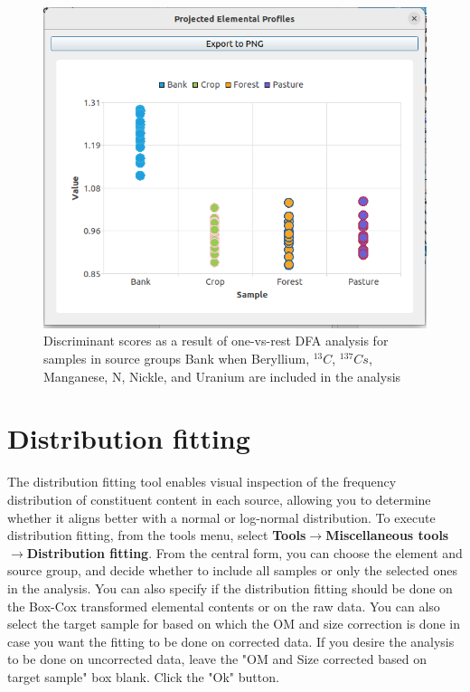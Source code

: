 \documentclass[12pt]{report}
\begin{document}
\begin{figure}[ht]
    \centering
    \includegraphics[width=14cm]{Figures/DFA_Scatter_onevstherest.png}
    \caption{Discriminant scores as a result of one-vs-rest DFA analysis for samples in source groups Bank when Beryllium, $^{13}C$,  $^{137}Cs$, Manganese, N, Nickle, and Uranium are included in the analysis}
    \label{fig:onevstherest-DFA-scatter}
\end{figure}
\FloatBarrier

\section{Distribution fitting}
The distribution fitting tool enables visual inspection of the frequency distribution of constituent content in each source, allowing you to determine whether it aligns better with a normal or log-normal distribution. To execute distribution fitting, from the tools menu, select \textbf{Tools}$\rightarrow$\textbf{Miscellaneous tools}$\rightarrow$\textbf{Distribution fitting}. From the central form, you can choose the element and source group, and decide whether to include all samples or only the selected ones in the analysis. You can also specify if the distribution fitting should be done on the Box-Cox transformed elemental contents or on the raw data. You can also select the target sample for based on which the OM and size correction is done in case you want the fitting to be done on corrected data. If you desire the analysis to be done on uncorrected data, leave the "OM and Size corrected based on target sample" box blank. Click the "Ok" button. 
\end{document}

